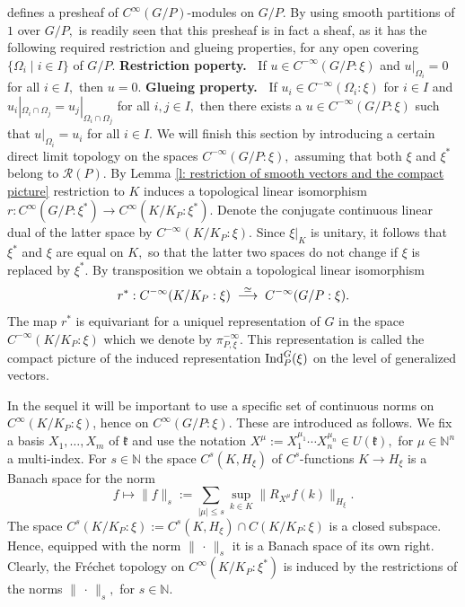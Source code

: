 \documentclass[12pt,a4paper]{article}
\def\medno{\medbreak\noindent}
\def\msy#1{{\mathbb #1}}
\def\N{{\msy N}}
\def\got#1{\mathfrak #1}
\def\fk{{\got k}}
\def\to{\rightarrow}
\def\cR{{\mathcal R}}
\numberwithin{Thm}{section}
\numberwithin{equation}{section}
\def\Ind{{\rm Ind}}
\def\dotvar{\, \cdot\,}
\numberwithin{equation}{section}
\def\col{\!:\!}
\begin{document}
defines a presheaf of  $C^\infty(G/P)$-modules on $G/P.$ 
By using smooth partitions of $1$ over $G/P,$ is readily seen that this presheaf is in fact a sheaf,
as it has the following required restriction and glueing properties, for any open covering
$\{\Omega_i\mid i \in I\}$ of $G/P.$ 
\medno
{\bf Restriction poperty.\ } If $u \in C^{-\infty}(G/P:\xi)$ and $u|_{\Omega_i} = 0$ for all 
$i\in I,$ then $u = 0.$ 
\medno
{\bf Glueing property.\ } If $u_i \in C^{-\infty}(\Omega_i:\xi)$ for $i \in I$ and
$u_i|_{\Omega_i\cap \Omega_j} = u_j|_{\Omega_i\cap \Omega_j}$ for all $i,j \in I,$ 
then there exists a $u \in C^{-\infty}(G/P:\xi)$ such that $u|_{\Omega_i}= u_i$ 
for all $i \in I.$ 
\medbreak
We will finish this section by introducing a certain direct limit topology
 on the spaces $C^{-\infty}(G/P:\xi),$ assuming that 
both $\xi$ and $\xi^*$ belong to $\cR(P).$                                                                                                                                                                 By Lemma \ref{l: restriction of smooth vectors and the compact picture}
restriction to $K$ induces a topological linear isomorphism $r: C^\infty(G/P:\xi^*) \to 
C^\infty(K/K_P: \xi^*).$ Denote the conjugate continuous linear dual of the latter
space by $C^{-\infty}(K/K_P: \xi).$ Since $\xi|_{K}$ is unitary,
it follows that $\xi^*$ and $\xi$ are equal on $K,$ so that the latter two spaces do not 
change if $\xi$ is  replaced by $\xi^*.$
By transposition we obtain a topological linear isomorphism 
\begin{equation}
\label{e: generalized compact picture}
r^*: C^{-\infty} (K/K_P:\xi)\;\;{\buildrel \simeq \over \longrightarrow} \;\;C^{-\infty} (G/P:\xi).
\end{equation}%
The map $r^*$ is equivariant for a uniquel representation of $G$ in the space $C^{-\infty}(K/K_P:\xi)$ 
which we denote by $\pi_{P, \xi}^{-\infty}.$ This representation is called the compact picture of the induced 
representation $\Ind_P^G(\xi)$ on the level of generalized vectors.

In the sequel it will be important to use a specific set of continuous norms
on $C^{\infty}(K/K_P\col \xi)$, hence on $C^{\infty} (G/P\col \xi).$ These are introduced as follows.
We fix a basis $X_1, \ldots, X_m$ of $\fk$ and use the notation $X^\mu := X_1^{\mu_1} \cdots X_n^{\mu_n} \in U(\fk),$ 
for $\mu \in \N^n$ a multi-index. For $s \in \N$ the space $C^s(K, H_\xi)$ of $C^s$-functions 
$K \to H_\xi$ is a Banach space for the norm
\begin{equation}
\label{e:  intro norm f s} 
f\mapsto \|f\|_s:= \sum_{|\mu| \leq s} \sup_{k \in K} \|R_{X^\mu} f(k)\|_{H_\xi}.
\end{equation}
The space $C^s(K/K_P\col \xi):= C^s(K, H_\xi)\cap C(K/K_P\col \xi)$ is a closed subspace. 
Hence, equipped with the norm $\|\dotvar \|_s$ it is a Banach space of its own right.
Clearly, the Fr\'echet topology on  $C^\infty(K/K_P:\xi^*)$ is induced by the restrictions
of the norms $\|\dotvar\|_s,$ for $s \in \N.$ 
\end{document}
